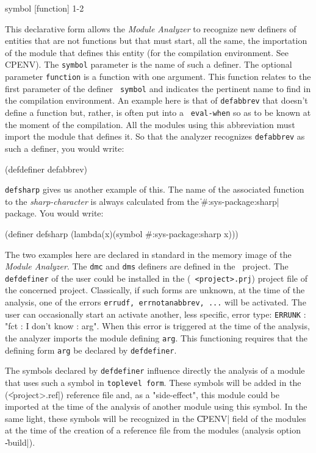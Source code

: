  {symbol [function]} {1-2}

This declarative form allows the {\em Module Analyzer} to recognize new definers of entities that are not functions but that must start, all the same, the importation of the module that defines this entity (for the compilation environment.  See CPENV).
The {\tt symbol} parameter is the name of such a definer.  The optional parameter {\tt function} is a function with one argument.  This function relates to the first parameter of the definer {\tt
symbol} and indicates the pertinent name to find in the compilation environment.
An example here is that of {\tt defabbrev} that doesn't define a function but, rather, is often put into a {\tt
eval-when} so as to be known at the moment of the compilation.  All the modules using this abbreviation must import the module that defines it.
So that the analyzer recognizes {\tt defabbrev} as such a definer, you would write:
\begin{Code*}
(defdefiner defabbrev)
\end{Code*}
{\tt defsharp} gives us another example of this.  The name of the associated function to the {\em sharp-character} is always calculated from the \|#:sys-package:sharp| package.  You would write:
\begin{Code*}
(definer defsharp (lambda(x)(symbol #:sys-package:sharp x)))
\end{Code*}
The two examples here are declared in standard in the memory image of the {\em Module Analyzer}.
The {\tt dmc} and {\tt dms} definers are defined in the \LeLisp\  project.  The {\tt defdefiner} of the user could be installed in the ({\tt
<project>.prj}) project file of the concerned project.
Classically, if such forms are unknown, at the time of the analysis, one of the errors {\tt errudf, errnotanabbrev, ...} will be activated.  The user can occasionally start an activate another, less specific, error type:  {\tt ERRUNK} : "fct : I don't know : arg".  When this error is triggered at the time of the analysis, the analyzer imports the module defining {\tt arg}.  This functioning requires that the defining form {\tt arg} be declared by {\tt defdefiner}.

The symbols declared by {\tt defdefiner} influence directly the analysis of a module that uses such a symbol in {\tt toplevel form}.  These symbols will be added in the (\|<project>.ref|) reference file and, as a "side-effect", this module could be imported at the time of the analysis of another module using this symbol.  In the same light, these symbols will be recognized in the \|CPENV| field of the modules at the time of the creation of a reference file from the modules (analysis option \|-build|).

